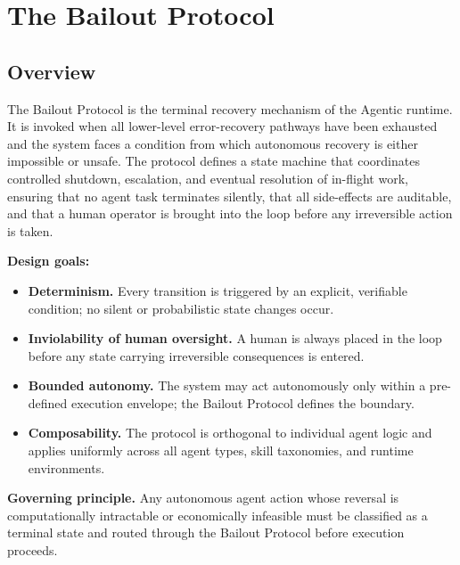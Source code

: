 \section{The Bailout Protocol}

\subsection{Overview}

The Bailout Protocol is the terminal recovery mechanism of the Agentic runtime.
It is invoked when all lower-level error-recovery pathways have been exhausted and
the system faces a condition from which autonomous recovery is either impossible or
unsafe.  The protocol defines a state machine that coordinates controlled shutdown,
escalation, and eventual resolution of in-flight work, ensuring that no agent task
terminates silently, that all side-effects are auditable, and that a human operator
is brought into the loop before any irreversible action is taken.

\bigskip

\noindent\textbf{Design goals:}

\begin{itemize}
  \itemsep0pt
  \item \textbf{Determinism.}  Every transition is triggered by an explicit,
    verifiable condition; no silent or probabilistic state changes occur.
  \item \textbf{Inviolability of human oversight.}  A human is always placed in
    the loop before any state carrying irreversible consequences is entered.
  \item \textbf{Bounded autonomy.}  The system may act autonomously only within
    a pre-defined execution envelope; the Bailout Protocol defines the boundary.
  \item \textbf{Composability.}  The protocol is orthogonal to individual agent
    logic and applies uniformly across all agent types, skill taxonomies, and
    runtime environments.
\end{itemize}

\bigskip

\noindent\textbf{Governing principle.}  Any autonomous agent action whose
reversal is computationally intractable or economically infeasible must be
classified as a terminal state and routed through the Bailout Protocol before
execution proceeds.

